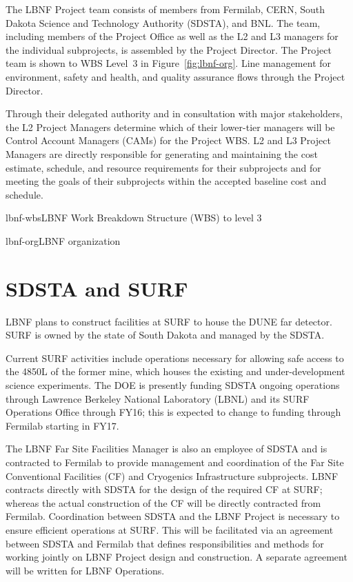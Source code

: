 
The LBNF Project team consists of members from Fermilab, CERN, South Dakota Science and Technology Authority (SDSTA), and BNL.  The team, including members of the Project Office as well as the L2 and L3 managers for the individual subprojects, is assembled by the Project Director. The Project team is shown to WBS Level~3 in Figure~\ref{fig:lbnf-org}. 
Line management for environment, safety and health, and quality assurance flows through the Project Director. 

Through their delegated authority and in consultation with major stakeholders, the L2 Project Managers determine which of their lower-tier managers will be Control Account Managers (CAMs) for the Project WBS. L2 and L3 Project Managers are directly responsible for generating and maintaining the cost estimate, schedule, and resource requirements for their subprojects and for meeting the goals of their subprojects within the accepted baseline cost and schedule. 

\begin{cdrfigure}{lbnf-wbs}{LBNF Work Breakdown Structure (WBS) to level 3}
\end{cdrfigure}



\begin{cdrfigure}{lbnf-org}{LBNF organization}
\end{cdrfigure}

\section{SDSTA and SURF}

LBNF plans to construct facilities at SURF to house the DUNE far detector. SURF is owned by the state of South Dakota and managed by the SDSTA. 

Current SURF activities include operations necessary for allowing safe access to the 4850L of the former mine, which houses the existing and under-development science experiments. The DOE is presently funding SDSTA ongoing operations through Lawrence Berkeley National Laboratory (LBNL) and its SURF Operations Office through FY16; this is expected to change to funding through Fermilab starting in FY17. 

The LBNF Far Site Facilities Manager is also an employee of SDSTA and is contracted to Fermilab to provide management and coordination of the Far Site Conventional Facilities (CF) and Cryogenics Infrastructure subprojects. LBNF contracts directly with SDSTA for the design of the required CF at SURF; whereas the actual construction of the CF will be directly contracted from Fermilab. Coordination between SDSTA and the LBNF Project is necessary to ensure efficient operations at SURF. This will be facilitated via an agreement between SDSTA and Fermilab  that defines responsibilities and methods for working jointly on LBNF Project design and construction. A separate agreement will be written for LBNF Operations. 

